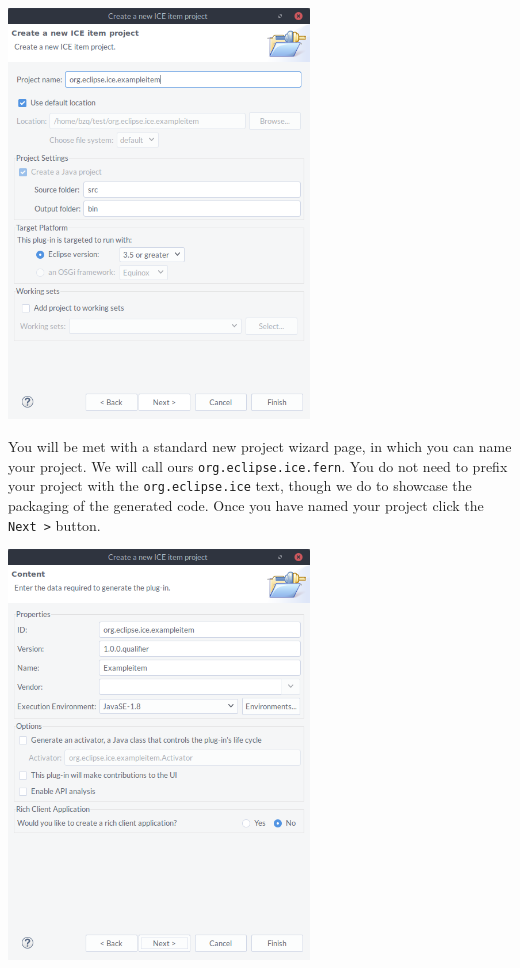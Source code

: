\documentclass{article} \usepackage{graphicx} \usepackage{hyperref}
\begin{document}
\begin{center} \includegraphics[width=8cm]{images/3} \end{center}

You will be met with a standard new project wizard page, in which you can name
your project.  We will call ours \texttt{org.eclipse.ice.fern}.  You do not
need to prefix your project with the \texttt{org.eclipse.ice} text, though we
do to showcase the packaging of the generated code.  Once you have named your
project click the \texttt{Next >} button.

\begin{center} \includegraphics[width=8cm]{images/4} \end{center}
\end{document}
